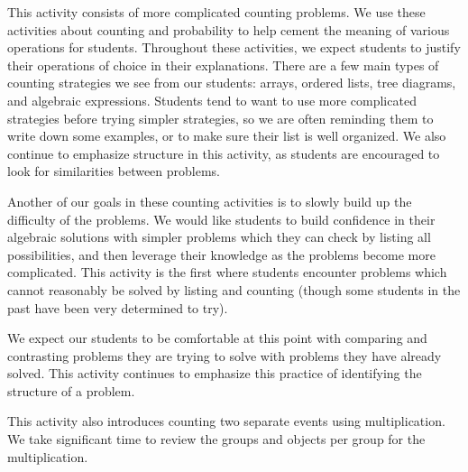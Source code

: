 \documentclass{ximera}
\begin{document}
\begin{instructorNotes}
This activity consists of more complicated counting problems.  We use these activities about counting and probability to help cement the meaning of various operations for students.  Throughout these activities, we expect students to justify their operations of choice in their explanations.  There are a few main types of counting strategies we see from our students: arrays, ordered lists, tree diagrams, and algebraic expressions.  Students tend to want to use more complicated strategies before trying simpler strategies, so we are often reminding them to write down some examples, or to make sure their list is well organized.  We also continue to emphasize structure in this activity, as students are encouraged to look for similarities between problems.


Another of our goals in these counting activities is to slowly build up the difficulty of the problems. We would like students to build confidence in their algebraic solutions with simpler problems which they can check by listing all possibilities, and then leverage their knowledge as the problems become more complicated.  This activity is the first where students encounter problems which cannot reasonably be solved by listing and counting (though some students in the past have been very determined to try).  

We expect our students to be comfortable at this point with comparing and contrasting problems they are trying to solve with problems they have already solved.  This activity continues to emphasize this practice of identifying the structure of a problem.

This activity also introduces counting two separate events using multiplication.  We take significant time to review the groups and objects per group for the multiplication.


\end{instructorNotes}
\end{document}
